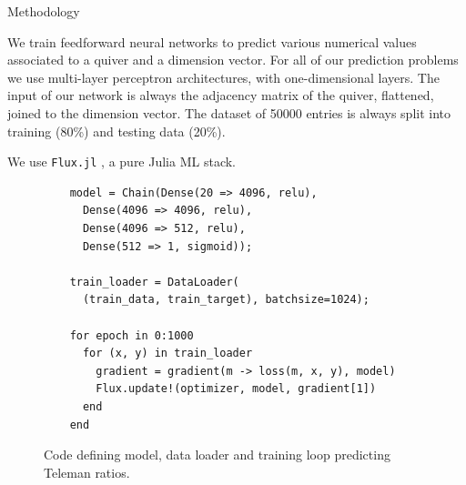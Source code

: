 \documentclass[final,20pt]{beamer}
\newlength{\colwidth}
\begin{document}
\begin{frame}[t, fragile]
\begin{columns}[t]
\begin{column}{\colwidth}
  \begin{block}{Methodology}

    We train feedforward neural networks to predict various numerical values
    associated to a quiver and a dimension vector.
    For all of our prediction problems we use multi-layer perceptron architectures,
    with one-dimensional layers.
    The input of our network is always the adjacency matrix of the quiver, flattened,
    joined to the dimension vector.
    The dataset of 50000 entries is always split into training (80\%) and testing data (20\%).

    We use {\tt{Flux.jl}} \cite{flux.jl,innes:2018}, a pure Julia ML stack.

    \begin{figure}
    \begin{verbatim}
    model = Chain(Dense(20 => 4096, relu),
      Dense(4096 => 4096, relu),
      Dense(4096 => 512, relu),
      Dense(512 => 1, sigmoid));

    train_loader = DataLoader(
      (train_data, train_target), batchsize=1024);

    for epoch in 0:1000
      for (x, y) in train_loader
        gradient = gradient(m -> loss(m, x, y), model)
        Flux.update!(optimizer, model, gradient[1])
      end
    end
    \end{verbatim}
    \caption{Code defining model, data loader and training loop predicting Teleman ratios.}
    \end{figure}





\end{block}
\end{column}
\end{columns}
\end{frame}
\end{document}
